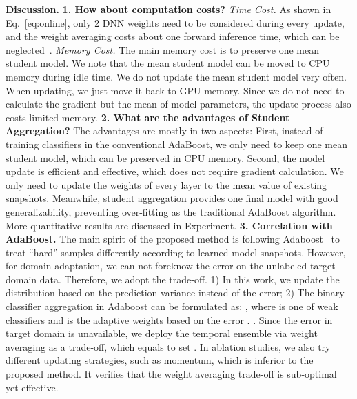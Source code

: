 \documentclass[journal]{IEEEtran}
\begin{document}
\noindent\textbf{Discussion.} 
\textbf{1. How about computation costs?} 
\emph{Time Cost.} As shown in Eq.~\ref{eq:online}, only 2 DNN weights need to be considered during every update, and the weight averaging costs about one forward inference time, which can be neglected~\cite{izmailov2018averaging}. \emph{Memory Cost.} The main memory cost is to preserve one mean student model. We note that the mean student model can be moved to CPU memory during idle time. We do not update the mean student model very often. When updating, we just move it back to GPU memory. Since we do not need to calculate the gradient but the mean of model parameters, the update process also costs limited memory.  
\textbf{2. What are the advantages of Student Aggregation?} The advantages are mostly in two aspects: First, instead of training  classifiers in the conventional AdaBoost, we only need to keep one mean student model, which can be preserved in CPU memory. Second, the model update is efficient and effective, which does not require gradient calculation. We only need to update the weights of every layer to the mean value of existing snapshots. Meanwhile, student aggregation provides one final model with good generalizability, preventing over-fitting as the traditional AdaBoost algorithm. More quantitative results are discussed in Experiment.
\textbf{3. Correlation with AdaBoost.} The main spirit of the proposed method is following Adaboost~\cite{freund1996experiments} to treat ``hard'' samples differently according to learned model snapshots. However, for domain adaptation, we can not foreknow the error  on the unlabeled target-domain data. Therefore, we adopt the trade-off. 1) In this work,  we update the distribution based on the prediction variance instead of the error; 2) The binary classifier aggregation in Adaboost can be formulated as: , where  is one of weak classifiers and  is the adaptive weights based on the error . . Since the error  in target domain is unavailable, we deploy the temporal ensemble via weight averaging as a trade-off, which equals to set . In ablation studies, we also try different updating strategies, such as momentum, which is inferior to the proposed method. It verifies that the weight averaging trade-off is sub-optimal yet effective.
\end{document}
